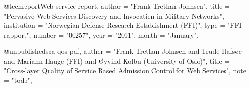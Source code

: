 @techreport{Web service report,
    author    = "Frank Trethan Johnsen",
    title     = "Pervasive Web Services Discovery and Invocation in Military Networks",
    institution = "Norwegian Defense Research Establishment (FFI)",
    type     = "FFI-rapport", 
    number   = "00257",
    year      = "2011",
    month    = "January",
}

@unpublished{soa-qos-pdf,
	author	= "Frank Trethan Johnsen and Trude Hafsøe and Mariann Hauge (FFI) and Øyvind Kolbu (University of Oslo)",
	title	= "Cross-layer Quality of Service Based Admission Control for Web Services",
	note	= "todo",
}

%


%        





